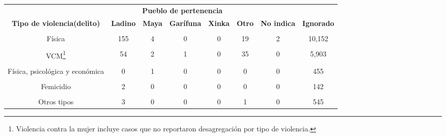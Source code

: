 \begin{tabular}[t]{cccccccc}
\toprule
\multicolumn{1}{c}{\textbf{ }} & \multicolumn{5}{c}{\textbf{Pueblo de pertenencia}} & \multicolumn{1}{c}{\textbf{ }} \\
\cmidrule(l{3pt}r{3pt}){2-6}
\textbf{Tipo de violencia(delito)} & \textbf{Ladino} & \textbf{Maya} & \textbf{Garífuna} & \textbf{Xinka} & \textbf{Otro} & \textbf{No indica} & \textbf{Ignorado}\\
\midrule
\cellcolor[HTML]{A8A4FB}{Psicológica} & \cellcolor[HTML]{A8A4FB}{32} & \cellcolor[HTML]{A8A4FB}{2} & \cellcolor[HTML]{A8A4FB}{0} & \cellcolor[HTML]{A8A4FB}{0} & \cellcolor[HTML]{A8A4FB}{5} & \cellcolor[HTML]{A8A4FB}{0} & \cellcolor[HTML]{A8A4FB}{17,408}\\
Física & 155 & 4 & 0 & 0 & 19 & 2 & 10,152\\
\cellcolor[HTML]{A8A4FB}{Física y psicológica} & \cellcolor[HTML]{A8A4FB}{20} & \cellcolor[HTML]{A8A4FB}{0} & \cellcolor[HTML]{A8A4FB}{0} & \cellcolor[HTML]{A8A4FB}{0} & \cellcolor[HTML]{A8A4FB}{0} & \cellcolor[HTML]{A8A4FB}{0} & \cellcolor[HTML]{A8A4FB}{9,558}\\
VCM\footnote{Violencia contra la mujer incluye casos que no reportaron desagregación por tipo de violencia.} & 54 & 2 & 1 & 0 & 35 & 0 & 5,903\\
\cellcolor[HTML]{A8A4FB}{Psicológica y económica} & \cellcolor[HTML]{A8A4FB}{2} & \cellcolor[HTML]{A8A4FB}{0} & \cellcolor[HTML]{A8A4FB}{0} & \cellcolor[HTML]{A8A4FB}{0} & \cellcolor[HTML]{A8A4FB}{0} & \cellcolor[HTML]{A8A4FB}{0} & \cellcolor[HTML]{A8A4FB}{603}\\
Física, psicológica y económica & 0 & 1 & 0 & 0 & 0 & 0 & 455\\
\cellcolor[HTML]{A8A4FB}{VCM y económica} & \cellcolor[HTML]{A8A4FB}{2} & \cellcolor[HTML]{A8A4FB}{0} & \cellcolor[HTML]{A8A4FB}{0} & \cellcolor[HTML]{A8A4FB}{0} & \cellcolor[HTML]{A8A4FB}{1} & \cellcolor[HTML]{A8A4FB}{0} & \cellcolor[HTML]{A8A4FB}{331}\\
Femicidio & 2 & 0 & 0 & 0 & 0 & 0 & 142\\
\cellcolor[HTML]{A8A4FB}{Física y económica} & \cellcolor[HTML]{A8A4FB}{0} & \cellcolor[HTML]{A8A4FB}{0} & \cellcolor[HTML]{A8A4FB}{0} & \cellcolor[HTML]{A8A4FB}{0} & \cellcolor[HTML]{A8A4FB}{0} & \cellcolor[HTML]{A8A4FB}{0} & \cellcolor[HTML]{A8A4FB}{120}\\
Otros tipos & 3 & 0 & 0 & 0 & 1 & 0 & 545\\
\bottomrule
\end{tabular}
